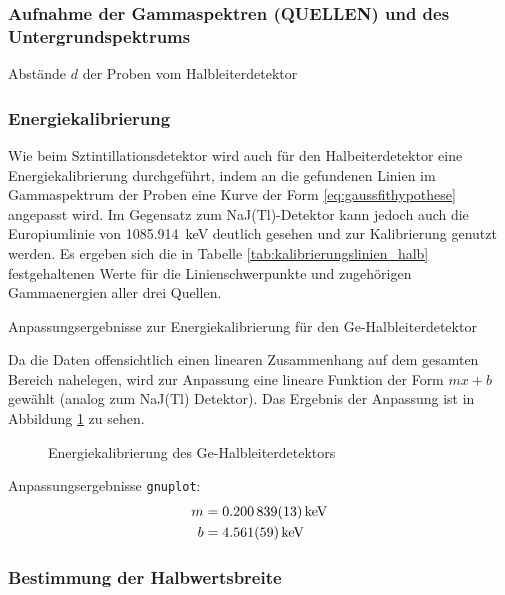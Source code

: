 \documentclass[11pt, a4paper]{article}
\numberwithin{equation}{section}
\begin{document}
\subsubsection{Aufnahme der Gammaspektren (QUELLEN) und des Untergrundspektrums}
\begin{table}[h]
	\centering
	
	\caption{Abstände $d$ der Proben vom Halbleiterdetektor}
	\label{tab:abstand_halbleiterdetektor}
\end{table}

\subsubsection{Energiekalibrierung}

Wie beim Sztintillationsdetektor wird auch für den Halbeiterdetektor eine Energiekalibrierung durchgeführt, indem an die gefundenen Linien im Gammaspektrum der Proben eine Kurve der Form \eqref{eq:gaussfithypothese} angepasst wird.
Im Gegensatz zum NaJ(Tl)-Detektor kann jedoch auch die Europiumlinie von \SI{1085.914}{\kilo\electronvolt} deutlich gesehen und zur Kalibrierung genutzt werden.
Es ergeben sich die in Tabelle \ref{tab:kalibrierungslinien_halb} festgehaltenen Werte für die Linienschwerpunkte und zugehörigen Gammaenergien aller drei Quellen.
\begin{table}[ht]
	\centering
	
	\caption{Anpassungsergebnisse zur Energiekalibrierung für den Ge-Halbleiterdetektor}
	\label{tab:kalibrierungslinien_halb}
\end{table}
Da die Daten offensichtlich einen linearen Zusammenhang auf dem gesamten Bereich nahelegen, wird zur Anpassung eine lineare Funktion der Form $mx + b$ gewählt (analog zum NaJ(Tl) Detektor).
Das Ergebnis der Anpassung ist in Abbildung \ref{fig:kalibrierung_halb} zu sehen.
\begin{figure}[ht]
	\centering
	
	\caption{Energiekalibrierung des Ge-Halbleiterdetektors}
	\label{fig:kalibrierung_halb}
\end{figure}  
Anpassungsergebnisse \texttt{gnuplot}:
\begin{align}
	m &= \SI{0.200839 +- 0.000013}{\kilo\electronvolt} \\
	b &= \SI{4.561 +- 0.059}{\kilo\electronvolt}
\end{align}


\subsubsection{Bestimmung der Halbwertsbreite}
\end{document}
